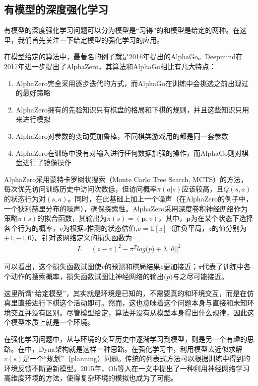     \subsection{有模型的深度强化学习}
      有模型的深度强化学习问题可以分为模型是``习得''的和模型是给定的两种。在这里，我们首先关注一下给定模型的强化学习的应用。
      \par 在模型给定的算法中，最著名的例子就是2016年提出的AlphaGo\cite{AlphaGo}。Deepmind在2017年进一步提出了AlphaZero\cite{AlphaZero}，其算法和AlphaGo相比有几大特点：
      \begin{enumerate}
        \item AlphaZero完全采用逐步迭代的方式，而AlphaGo在训练中会挑选之前出现过的最好策略
        \item AlphaZero拥有的先验知识只有棋盘的格局和下棋的规则，并且这些知识只用来进行模拟
        \item AlphaZero对参数的变动更加鲁棒，不同棋类游戏用的都是同一套参数
        \item AlphaZero在训练中没有对输入进行任何数据加强的操作，而AlphaGo则对棋盘进行了镜像操作
      \end{enumerate}
      \par AlphaZero采用蒙特卡罗树状搜索（Monte Carlo Tree Search, MCTS\cite{Sutton_book}）的方法，每次优先访问训练历史中访问次数低，但访问概率$\pi(a|s)$应该较高，且$Q(s, a)$的状态行为对$(s, a)$。同时，在此基础上加上一个噪声（在AlphaZero的例子中，一个狄利赫里分布的噪声），确保探索性。AlphaZero采用深度卷积神经网络作为策略$\pi(s)$的拟合函数，其输出为$\pi(s) = (\mathbf{p}, v)$，其中，$\mathbf{p}$为在某个状态下选择各个行为的概率，$v$为根据$s$推测的状态估值,$v = \mathbb{E}[z]$（胜负平局，$z$的值分别为$+1, -1, 0$）。针对该网络定义的损失函数为
      \begin{align}
        L = (z-v)^2 - \pi^T log \mathbf(p) + \lambda ||\theta||^2
      \end{align}
      \par 可以看出，这个损失函数试图使$v$的预测和棋局结果$z$更加接近；$\pi$代表了训练中各个动作的搜索概率，损失函数试图让神经网络的输出$\mathbf(p)$与之尽可能接近。
      \par 这里所谓“给定模型”，其实就是环境是已知的，不需要真的和环境交互，而是在仿真里直接进行下棋这个活动即可。然而，这也意味着这个问题本身与直接和未知环境交互并没有区别。尽管模型给定，算法并没有从模型本身得出什么规律，因此这个模型本质上就是一个环境。\par
      在强化学习问题中，从与环境的交互历史中逐渐学习到模型，则是另一个有趣的思路。在\cite{Sutton_book}中，Dyna架构就是这样一种思路。在强化学习中，利用模型去近似求解$v(s)$是一个``规划''（planning）问题。传统的列表式方法可以根据训练中得到的环境反馈不断更新模型。2015年，Oh等人在\cite{action-conditional_prediction}一文中提出了一种利用神经网络学习高维度环境的方法，使得复杂环境的模拟也成为了可能。\par 
